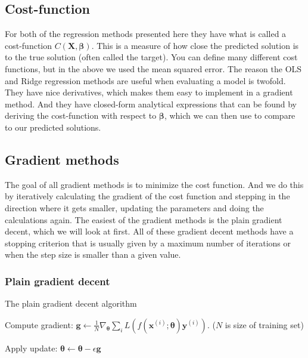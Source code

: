 \subsection{Cost-function}
{
    For both of the regression methods presented here they have what is called
    a cost-function $C(\boldsymbol{X}, \boldsymbol{\beta})$. This is a measure
    of how close the predicted solution is to the true solution (often called
    the target). You can define many different cost functions, but in the above
    we used the mean squared error. The reason the OLS and Ridge regression
    methods are useful when evaluating a model is twofold. They have nice
    derivatives, which makes them easy to implement in a gradient method. And
    they have closed-form analytical expressions that can be found by deriving
    the cost-function with respect to $\boldsymbol{\beta}$, which we can then
    use to compare to our predicted solutions.
}

\subsection{Gradient methods}
The goal of all gradient methods is to minimize the cost function. And we do
this by iteratively calculating the gradient of the cost function and stepping
in the direction where it gets smaller, updating the parameters and doing the
calculations again. The easiest of the gradient methods is the plain gradient
decent, which we will look at first. All of these gradient decent methods have
a stopping criterion that is usually given by a maximum number of iterations or
when the step size is smaller than a given value.

\subsubsection{Plain gradient decent}
\begin{algorithm}
\caption{The plain gradient decent algorithm}\label{alg:plain_gd}
\begin{algorithmic}
    
        
        Compute gradient: $\boldsymbol{g}\gets \frac{1}{N}\nabla_{\boldsymbol\theta}
        \sum_{i}L(f(\boldsymbol{x}^{(i)};\boldsymbol{\theta})\boldsymbol{y}^{(i)})$.
        ($N$ is size of training set)

        Apply update: $\boldsymbol\theta \gets \boldsymbol\theta
        -\epsilon\boldsymbol{g}$
    \EndWhile
\end{algorithmic}
\end{algorithm}

